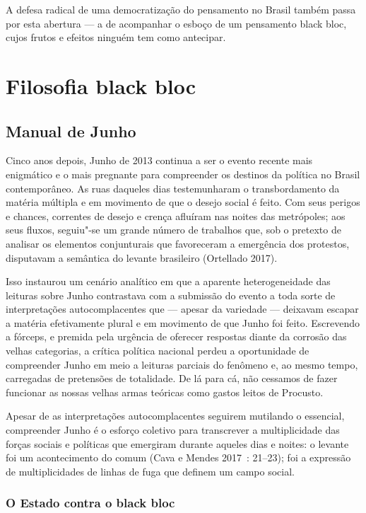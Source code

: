 A defesa radical de uma democratização do pensamento no Brasil também
passa por esta abertura --- a de acompanhar o esboço de um pensamento
black bloc, cujos frutos e efeitos ninguém tem como antecipar.

\part{Filosofia black bloc}

\chapter{Manual de Junho}

Cinco anos depois, Junho de 2013 continua a ser o evento recente mais
enigmático e o mais pregnante para compreender os destinos da política
no Brasil contemporâneo. As ruas daqueles dias testemunharam o
transbordamento da matéria múltipla e em movimento de que o desejo
social é feito. Com seus perigos e chances, correntes de desejo e crença
afluíram nas noites das metrópoles; aos seus fluxos, seguiu"-se um grande
número de trabalhos que, sob o pretexto de analisar os elementos
conjunturais que favoreceram a emergência dos protestos, disputavam a
semântica do levante brasileiro (Ortellado 2017).

Isso instaurou um cenário analítico em que a aparente heterogeneidade
das leituras sobre Junho contrastava com a submissão do evento a toda
sorte de interpretações autocomplacentes que --- apesar da variedade ---
deixavam escapar a matéria efetivamente plural e em movimento de que
Junho foi feito. Escrevendo a fórceps, e premida pela urgência de
oferecer respostas diante da corrosão das velhas categorias, a crítica
política nacional perdeu a oportunidade de compreender Junho em meio a
leituras parciais do fenômeno e, ao mesmo tempo, carregadas de
pretensões de totalidade. De lá para cá, não cessamos de fazer funcionar
as nossas velhas armas teóricas como gastos leitos de Procusto.

Apesar de as interpretações autocomplacentes seguirem mutilando o
essencial, compreender Junho é o esforço coletivo para transcrever a
multiplicidade das forças sociais e políticas que emergiram durante
aqueles dias e noites: o levante foi um acontecimento do comum (Cava e
Mendes 2017~: 21--23); foi a expressão de multiplicidades de linhas de
fuga que definem um campo social.

\section{O Estado contra o black bloc}

